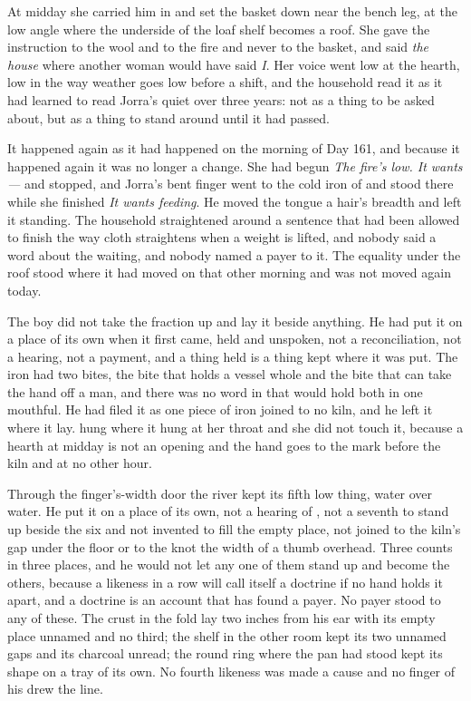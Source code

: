 At midday she carried him in and set the basket down near the bench leg, at the low angle where the underside of the loaf shelf becomes a roof. She gave the instruction to the wool and to the fire and never to the basket, and said \emph{the house} where another woman would have said \emph{I}. Her voice went low at the hearth, low in the way weather goes low before a shift, and the household read it as it had learned to read Jorra's quiet over three years: not as a thing to be asked about, but as a thing to stand around until it had passed.

It happened again as it had happened on the morning of Day 161, and because it happened again it was no longer a change. She had begun \emph{The fire's low. It wants---} and stopped, and Jorra's bent finger went to the cold iron of  and stood there while she finished \emph{It wants feeding}. He moved the tongue a hair's breadth and left it standing. The household straightened around a sentence that had been allowed to finish the way cloth straightens when a weight is lifted, and nobody said a word about the waiting, and nobody named a payer to it. The equality under the roof stood where it had moved on that other morning and was not moved again today.

The boy did not take the fraction up and lay it beside anything. He had put it on a place of its own when it first came, held and unspoken, not a reconciliation, not a hearing, not a payment, and a thing held is a thing kept where it was put. The iron had two bites, the bite that holds a vessel whole and the bite that can take the hand off a man, and there was no word in  that would hold both in one mouthful. He had filed it as one piece of iron joined to no kiln, and he left it where it lay.  hung where it hung at her throat and she did not touch it, because a hearth at midday is not an opening and the hand goes to the mark before the kiln and at no other hour.

Through the finger's-width door the river kept its fifth low thing, water over water. He put it on a place of its own, not a hearing of , not a seventh to stand up beside the six and not invented to fill the empty place, not joined to the kiln's gap under the floor or to the knot the width of a thumb overhead. Three counts in three places, and he would not let any one of them stand up and become the others, because a likeness in a row will call itself a doctrine if no hand holds it apart, and a doctrine is an account that has found a payer. No payer stood to any of these. The crust in the fold lay two inches from his ear with its empty place unnamed and no third; the shelf in the other room kept its two unnamed gaps and its charcoal unread; the round ring where the pan had stood kept its shape on a tray of its own. No fourth likeness was made a cause and no finger of his drew the line.


